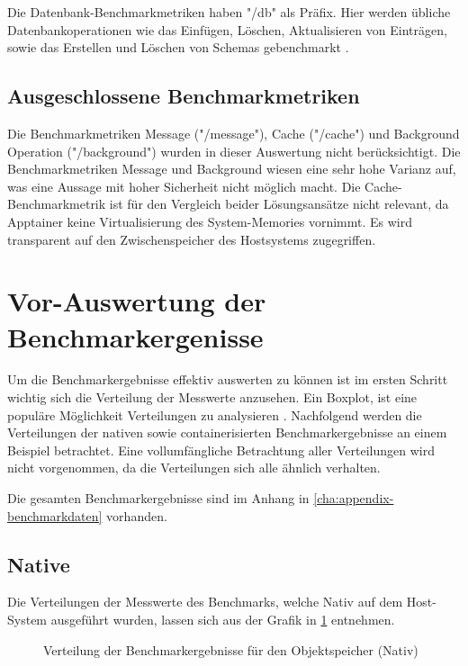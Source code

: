 Die Datenbank-Benchmarkmetriken haben "/db" als Präfix. Hier werden übliche Datenbankoperationen wie das Einfügen, Löschen, Aktualisieren von Einträgen, sowie das Erstellen und Löschen von Schemas gebenchmarkt \cite[Vgl. 718]{kuhnJULEAFlexibleStorage2017}.

\subsection{Ausgeschlossene Benchmarkmetriken}

Die Benchmarkmetriken Message ("/message"), Cache ("/cache") und Background Operation ("/background") wurden in dieser Auswertung nicht berücksichtigt. Die Benchmarkmetriken Message und Background wiesen eine sehr hohe Varianz auf, was eine Aussage mit hoher Sicherheit nicht möglich macht. Die Cache-Benchmarkmetrik ist für den Vergleich beider Lösungsansätze nicht relevant, da Apptainer keine Virtualisierung des System-Memories vornimmt. Es wird transparent auf den Zwischenspeicher des Hostsystems zugegriffen.   

\section{Vor-Auswertung der Benchmarkergenisse}

Um die Benchmarkergebnisse effektiv auswerten zu können ist im ersten Schritt wichtig sich die Verteilung der Messwerte anzusehen. Ein Boxplot, ist eine populäre Möglichkeit Verteilungen zu analysieren \cite[Vgl. 1]{majawExploringDataDistributions2023}. Nachfolgend werden die Verteilungen der nativen sowie containerisierten Benchmarkergebnisse an einem Beispiel betrachtet. Eine vollumfängliche Betrachtung aller Verteilungen wird nicht vorgenommen, da die Verteilungen sich alle ähnlich verhalten.

Die gesamten Benchmarkergebnisse sind im Anhang in \cref{cha:appendix-benchmarkdaten} vorhanden.

\pagebreak

\subsection{Native}

Die Verteilungen der Messwerte des Benchmarks, welche Nativ auf dem Host-System ausgeführt wurden, lassen sich aus der Grafik in \cref{fig:boxplot_object} entnehmen.

\begin{figure}[H]
    
    \caption{Verteilung der Benchmarkergebnisse für den Objektspeicher (Nativ)}
    \label{fig:boxplot_object}
\end{figure}
\FloatBarrier


